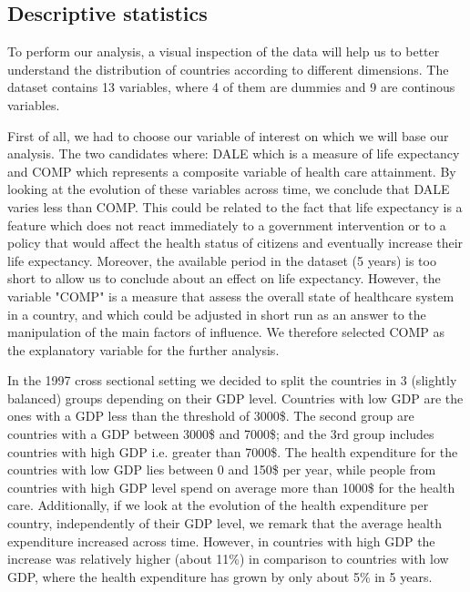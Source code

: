 \documentclass[12pt,a4paper]{article}\usepackage[]{graphicx}\usepackage[]{color}
\begin{document}
\subsection{Descriptive statistics}




  To perform our analysis, a visual inspection of the data will help  us to better understand the distribution of countries according to different dimensions. The dataset contains 13 variables, where 4 of them are dummies and 9 are continous variables. 
  
First of all, we had to choose our variable of interest on which we will base our analysis.  The two candidates where: DALE which is a measure of life expectancy and COMP which represents a composite variable of health care attainment. By looking at the evolution of these variables across time, we conclude that DALE varies less than COMP. This could be related to the fact that life expectancy is a feature which does not react immediately to a government intervention or to a policy that would affect the health status of citizens and eventually increase their life expectancy. Moreover, the available period in the dataset (5 years) is too short to allow us to conclude about an effect on life expectancy. However, the variable "COMP" is a measure that assess the overall state of healthcare system in a country, and which could be adjusted in  short run as an answer to the manipulation of the main factors of influence. We therefore selected  COMP as the explanatory variable for the further analysis.

\break
In the 1997 cross sectional setting we decided to split the countries in 3 (slightly balanced) groups depending on their GDP level. Countries with low GDP are the ones with a GDP less than the threshold of 3000\$. The second group are  countries with a GDP between 3000\$ and 7000\$; and the 3rd group includes  countries with high GDP i.e. greater than 7000\$.  
The health expenditure for the countries with low GDP lies between 0 and 150\$ per year, while people from countries with  high GDP level spend on average more than 1000\$ for the health care.  Additionally, if we look at the evolution of the health expenditure per country, independently of their GDP level, we remark that the average health expenditure increased across time. However, in countries with high GDP the increase was relatively higher (about 11\%) in comparison to countries with low GDP,  where the health expenditure has grown by only about 5\% in 5 years.
\end{document}
